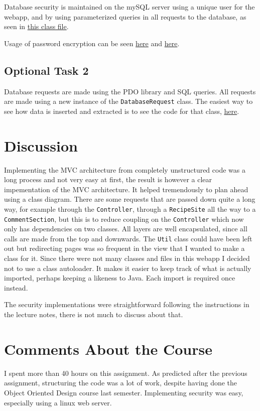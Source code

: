 \documentclass[a4paper]{scrreprt}
\newcommand{\code}[1]{\texttt{#1}}
\begin{document}
Database security is maintained on the mySQL server using a unique user for the webapp, and by using parameterized queries in all requests to the database, as seen in \href{https://github.com/fongie/TastyRecipes/blob/assignment3/src/integration/DatabaseRequest.php}{this class file}.

Usage of password encryption can be seen \href{https://github.com/fongie/TastyRecipes/blob/86f4548c3b4659b762134c756cc5ac4c0cbf72a2/src/model/UserAccountHandler.php#L35}{here} and \href{https://github.com/fongie/TastyRecipes/blob/86f4548c3b4659b762134c756cc5ac4c0cbf72a2/src/model/UserAccountHandler.php#L18}{here}.

\section{Optional Task 2}

Database requests are made using the PDO library and SQL queries. All requests are made using a new instance of the \code{DatabaseRequest} class. The easiest way to see how data is inserted and extracted is to see the code for that class, \href{https://github.com/fongie/TastyRecipes/blob/assignment3/src/integration/DatabaseRequest.php}{here}.

\chapter{Discussion}

Implementing the MVC architecture from completely unstructured code was a long process and not very easy at first, the result is however a clear impementation of the MVC architecture. It helped tremendously to plan ahead using a class diagram. There are some requests that are passed down quite a long way, for example through the \code{Controller}, through a \code{RecipeSite} all the way to a \code{CommentSection}, but this is to reduce coupling on the \code{Controller} which now only has dependencies on two classes. All layers are well encapsulated, since all calls are made from the top and downwards. The \code{Util} class could have been left out but redirecting pages was so frequent in the view that I wanted to make a class for it. Since there were not many classes and files in this webapp I decided not to use a class autoloader. It makes it easier to keep track of what is actually imported, perhaps keeping a likeness to Java. Each import is required once instead.

The security implementations were straightforward following the instructions in the lecture notes, there is not much to discuss about that.

\chapter{Comments About the Course}

I spent more than 40 hours on this assignment.
As predicted after the previous assignment, structuring the code was a lot of work, despite having done the Object Oriented Design course last semester.
Implementing security was easy, especially using a linux web server.
\end{document}
